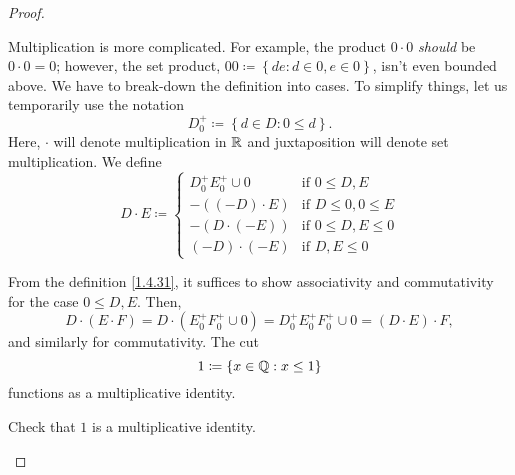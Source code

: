 \begin{thm}
\begin{proof}
\begin{savenotes}
Multiplication is more complicated.  For example, the product $0\cdot 0$ \emph{should} be $0\cdot 0=0$; however, the set product, $00\coloneqq \left\{ de:d\in 0,e\in 0\right\}$, isn't even bounded above.  We have to break-down the definition into cases.  To simplify things, let us temporarily use the notation
\begin{equation}
D_0^+\coloneqq \left\{ d\in D:0\leq d\right\} .
\end{equation}Here, $\cdot$ will denote multiplication in $\mathbb{R}$ and juxtaposition will denote set multiplication.  We define
\begin{equation}\label{1.4.31}
D\cdot E\coloneqq \begin{cases}D_0^+E_0^+\cup 0 & \text{if }0\leq D,E  \\ -\left( (-D)\cdot E\right) & \text{if }D\leq 0,0\leq E \\ -\left( D\cdot (-E)\right) & \text{if }0\leq D,E\leq 0 \\ (-D)\cdot (-E) & \text{if }D,E\leq 0\end{cases}
\end{equation}

From the definition \eqref{1.4.31}, it suffices to show associativity and commutativity for the case $0\leq D,E$.  Then,
\begin{equation}
D\cdot (E\cdot F)=D\cdot \left( E_0^+F_0^+\cup 0\right) =D_0^+E_0^+F_0^+\cup 0=(D\cdot E)\cdot F,
\end{equation}
and similarly for commutativity.  The cut
\begin{equation}
1\coloneqq \left\{ x\in \mathbb{Q} :x\leq 1\right\}
\end{equation}
functions as a multiplicative identity.
\begin{exr}
Check that $1$ is a multiplicative identity.
\end{exr}


\end{savenotes}
\end{proof}
\end{thm}
